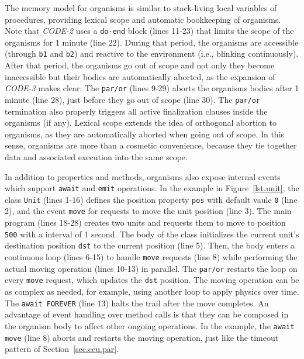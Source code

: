 \documentclass{acm_proc_article-sp}
\newcommand{\code}[1] {{\small{\texttt{#1}}}}
\newcommand{\1}{\;}
\newcommand{\2}{\;\;}
\newcommand{\3}{\;\;\;}
\newcommand{\5}{\;\;\;\;\;}
\begin{document}
%

The memory model for organisms is similar to stack-living local variables of 
procedures, providing lexical scope and automatic bookkeeping of organisms.
Note that \emph{CODE-2} uses a \code{do-end} block (lines 11-23) that limits 
the scope of the organisms for 1 minute (line 22).
%
During that period, the organisms are accessible (through \code{b1} and 
\code{b2}) and reactive to the environment (i.e., blinking continuously).
%
After that period, the organisms go out of scope and not only they become 
inaccessible but their bodies are automatically aborted, as the expansion of 
\emph{CODE-3} makes clear:
%
The \code{par/or} (lines 9-29) aborts the organisms bodies after 1 minute (line 
28), just before they go out of scope (line 30).
%
The \code{par/or} termination also properly triggers all active finalization 
clauses inside the organisms (if any).
%
Lexical scope extends the idea of orthogonal abortion to organisms, as they are 
automatically aborted when going out of scope.
%
In this sense, organisms are more than a cosmetic convenience, because they tie 
together data and associated execution into the same scope.

In addition to properties and methods, organisms also expose internal events 
which support \code{await} and \code{emit} operations.
%
In the example in Figure~\ref{lst.unit}, the class \code{Unit} (lines 1-16) 
defines the position property \code{pos} with default vaule \code{0} (line 2), 
and the event \code{move} for requests to move the unit position (line 3).
%
The main program (lines 18-28) creates two units and requests them to move to 
position \code{500} with a interval of 1 second.
%
The body of the class initializes the current unit's destination position 
\code{dst} to the current position (line 5).
Then, the body enters a continuous loop (lines 6-15) to handle \code{move} 
requests (line 8) while performing the actual moving operation (lines 10-13) in 
parallel.
The \code{par/or} restarts the loop on every \code{move} request, which updates 
the \code{dst} position.
%
The moving operation can be as complex as needed, for example, using another 
loop to apply physics over time.
The \code{await FOREVER} (line 13) halts the trail after the move completes.
%
An advantage of event handling over method calls is that they can be composed 
in the organism body to affect other ongoing operations.
In the example, the \code{await move} (line 8) aborts and restarts the moving 
operation, just like the timeout pattern of Section~\ref{sec.ceu.par}.
\end{document}

